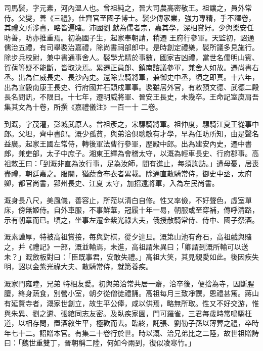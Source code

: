 
\begin{pinyinscope}

 司馬褧，字元素，河內溫人也。曾祖純之，晉大司農高密敬王。祖讓之，員外常侍。父燮，善《三禮》，仕齊官至國子博士。褧少傳家業，強力專精，手不釋卷，其禮文所涉書，略皆遍睹。沛國劉獻為儒者宗，嘉其學，深相賞好。少與樂安任昉善，昉亦推重焉。初為國子生，起家奉朝請，稍遷
 王府行參軍。天監初，詔通儒治五禮，有司舉褧治嘉禮，除尚書祠部郎中。是時創定禮樂，褧所議多見施行。除步兵校尉，兼中書通事舍人。褧學尤精於事數，國家吉凶禮，當世名儒明山賓、賀蒨等疑不能斷，皆取決焉。累遷正員郎、鎮南諮議參軍，兼舍人如故。遷尚書右丞。出為仁威長史、長沙內史。還除雲騎將軍，兼御史中丞，頃之即真。十六年，出為宣毅南康王長史、行府國并石頭戍軍事。褧雖居外官，有敕預文德、武德二殿長名問訊，不限日。十七年，遷明威將軍、晉安王長史，未幾卒。王命記室庾肩吾集其文為十卷，所撰《嘉禮儀注》一百一十
 二卷。



 到溉，字茂灌，彭城武原人。曾祖彥之，宋驃騎將軍。祖仲度，驃騎江夏王從事中郎。父坦，齊中書郎。溉少孤貧，與弟洽俱聰敏有才學，早為任昉所知，由是聲名益廣。起家王國左常侍，轉後軍法曹行參軍，歷殿中郎。出為建安內史，遷中書郎，兼吏部，太子中庶子。湘東王繹為會稽太守，以溉為輕車長史、行府郡事。高祖敕王曰：「到溉非直為汝行事，足為汝師，間有進止，每須詢訪。」遭母憂，居喪盡禮，朝廷嘉之。服闋，猶蔬食布衣者累載。除通直散騎常侍，御史中丞，太府卿，都官尚書，郢州長史、江夏
 太守，加招遠將軍，入為左民尚書。



 溉身長八尺，美風儀，善容止，所蒞以清白自修。性又率儉，不好聲色，虛室單床，傍無姬侍。自外車服，不事鮮華，冠履十年一易，朝服或至穿補，傳呼清路，示有朝章而已。頃之，坐事左遷金紫光祿大夫，俄授散騎常侍、侍中、國子祭酒。



 溉素謹厚，特被高祖賞接，每與對棋，從夕達旦。溉第山池有奇石，高祖戲與賭之，并《禮記》一部，溉並輸焉，未進，高祖謂朱異曰；「卿謂到溉所輸可以送未？」溉斂板對曰：「臣既事君，安敢失禮。」高祖大笑，其見親愛如此。後因疾失明，詔以金紫光祿大夫、散騎常侍，就第養疾。



 溉家門雍睦，兄弟
 特相友愛。初與弟洽常共居一齋，洽卒後，便捨為寺，因斷腥膻，終身蔬食，別營小室，朝夕從僧徒禮誦。高祖每月三致凈饌，恩禮甚篤。蔣山有延賢寺者，溉家世創立，故生平公俸，咸以供焉，略無所取。性又不好交游，惟與朱異、劉之遴、張綰同志友密。及臥疾家園，門可羅雀，三君每歲時常鳴騶枉道，以相存問，置酒敘生平，極歡而去。臨終，託張、劉勒子孫以薄葬之禮，卒時年七十二。詔贈本官。有集二十卷行於世。時以溉、洽兄弟比之二陸，故世祖贈詩曰：「魏世重雙丁，晉朝稱二陸，何如今兩到，復似凌寒竹。」




\end{pinyinscope}
